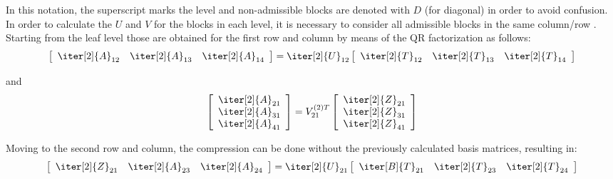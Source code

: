 \noindent In this notation, the superscript marks the level and non-admissible blocks are denoted with $D$ (for diagonal) in order to avoid confusion. In order to calculate the $U$ and $V$ for the blocks in each  level, it is necessary to consider all admissible blocks in the same column/row \cite{xia_fast_2010}. Starting from the leaf level those are obtained for the first row and column by means of the QR factorization as follows:
\begin{equation}
  \left[
    \begin{array}{ccc}
      \iter[2]{A}_{12} & \iter[2]{A}_{13}& \iter[2]{A}_{14} \\
    \end{array}
  \right]
  = \iter[2]{U}_{12}
  \left[
    \begin{array}{ccc}
      \iter[2]{T}_{12} & \iter[2]{T}_{13}& \iter[2]{T}_{14} \\
    \end{array}
  \right]
\end{equation}

\noindent and
\begin{equation}
  \left[
    \begin{array}{c}
      \iter[2]{A}_{21} \\
      \iter[2]{A}_{31} \\
      \iter[2]{A}_{41} \\
    \end{array}
  \right]
  = V_{21}^{(2)T}
  \left[
    \begin{array}{ccc}
      \iter[2]{Z}_{21} \\
      \iter[2]{Z}_{31} \\
      \iter[2]{Z}_{41} \\
    \end{array}
  \right]
\end{equation}

\noindent Moving to the second row and column, the compression can be done without the previously calculated basis matrices, resulting in:
\begin{equation}
  \left[
    \begin{array}{ccc}
      \iter[2]{Z}_{21} & \iter[2]{A}_{23}& \iter[2]{A}_{24} \\
    \end{array}
  \right]
  = \iter[2]{U}_{21}
  \left[
    \begin{array}{ccc}
      \iter[B]{T}_{21} & \iter[2]{T}_{23}& \iter[2]{T}_{24} \\
    \end{array}
  \right]
\end{equation}

